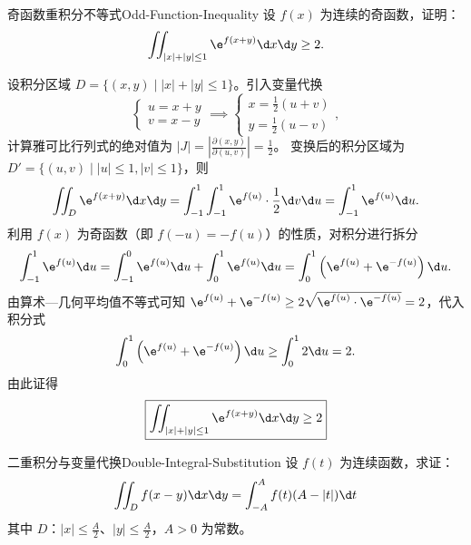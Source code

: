 \begin{problem}{奇函数重积分不等式}{Odd-Function-Inequality}
    设 $f(x)$ 为连续的奇函数，证明：
    \begin{equation}
        \iint_{|x|+|y| \le 1} \e^{f(x+y)} \d x \d y \ge 2.
    \end{equation}
\end{problem}

\begin{myproof}
    设积分区域 $D = \{ (x, y) \mid |x| + |y| \le 1 \}$。引入变量代换
    \begin{equation}
        \begin{cases} u = x + y \\ v = x - y \end{cases} \implies \begin{cases} x = \frac{1}{2}(u + v) \\ y = \frac{1}{2}(u - v) \end{cases},
    \end{equation}
    计算雅可比行列式的绝对值为 $|J| = \left| \frac{\partial(x, y)}{\partial(u, v)} \right| = \frac{1}{2}$。
    变换后的积分区域为 $D' = \{ (u, v) \mid |u| \le 1, |v| \le 1 \}$，则
    \begin{equation}
        \iint_D \e^{f(x+y)} \d x \d y = \int_{-1}^1 \int_{-1}^1 \e^{f(u)} \cdot \frac{1}{2} \d v \d u = \int_{-1}^1 \e^{f(u)} \d u.
    \end{equation}
    利用 $f(x)$ 为奇函数（即 $f(-u) = -f(u)$）的性质，对积分进行拆分
    \begin{equation}
        \int_{-1}^1 \e^{f(u)} \d u = \int_{-1}^0 \e^{f(u)} \d u + \int_0^1 \e^{f(u)} \d u = \int_0^1 \left( \e^{f(u)} + \e^{-f(u)} \right) \d u.
    \end{equation}
    由算术—几何平均值不等式可知 $\e^{f(u)} + \e^{-f(u)} \ge 2\sqrt{\e^{f(u)} \cdot \e^{-f(u)}} = 2$，代入积分式
    \begin{equation}
        \int_0^1 \left( \e^{f(u)} + \e^{-f(u)} \right) \d u \ge \int_0^1 2 \d u = 2.
    \end{equation}
    由此证得
    \begin{equation}
        \boxed{\iint_{|x|+|y| \le 1} \e^{f(x+y)} \d x \d y \ge 2}
    \end{equation}
\end{myproof}


\begin{problem}{二重积分与变量代换}{Double-Integral-Substitution}
    设 $f(t)$ 为连续函数，求证：
    \begin{equation}
        \iint_D f(x - y) \d x \d y = \int_{-A}^A f(t)(A - |t|) \d t
    \end{equation}
    其中 $D$：$|x| \le \frac{A}{2}$、$|y| \le \frac{A}{2}$，$A > 0$ 为常数。
\end{problem}

